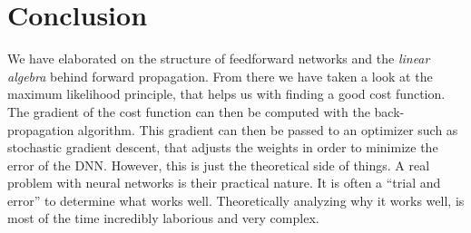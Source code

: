 \section{Conclusion}
\label{sec:conclusion}

We have elaborated on the structure of feedforward networks and the \emph{linear algebra} behind forward propagation.
From there we have taken a look at the maximum likelihood principle, that helps us with finding a good cost function.
The gradient of the cost function can then be computed with the back-propagation algorithm.
This gradient can then be passed to an optimizer such as stochastic gradient descent, that adjusts the weights in order to minimize the error of the DNN.
However, this is just the theoretical side of things.
A real problem with neural networks is their practical nature.
It is often a \enquote{trial and error} to determine what works well.
Theoretically analyzing why it works well, is most of the time incredibly laborious and very complex.